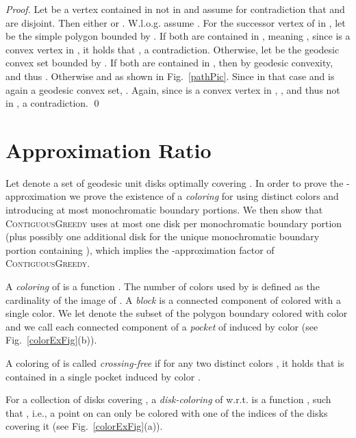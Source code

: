 \documentclass{llncs}
\begin{document}
\begin{proof}

Let  be a vertex contained in   not in  and assume for contradiction that  and  are disjoint. 
Then either  or . W.l.o.g.  assume  . For  the successor vertex of  in , let  be the simple polygon bounded by . If both  are contained in , meaning , since  is a convex vertex in , it holds that , a contradiction. Otherwise, let  be the geodesic convex set bounded by . If both  are contained in , then by geodesic convexity,  and thus . Otherwise  and  as shown in Fig.~\ref{pathPic}. Since in that case  and  is again a geodesic convex set, . Again, since  is a convex vertex in , , and thus  not in , a contradiction.
\qed


\end{proof}







\section{Approximation Ratio}
\label{approx}

Let  denote a set of geodesic unit disks optimally covering . In order to prove the -approximation we prove the existence of a {\em coloring} for   using  distinct colors and introducing at most  monochromatic boundary portions. We then show that  \textsc{ContiguousGreedy} uses at most one disk per monochromatic boundary portion (plus possibly one additional disk for the unique monochromatic boundary portion containing ), which implies the -approximation factor of  \textsc{ContiguousGreedy}. 

{A {\em coloring} of  is a function .  The number of colors used by  is defined as the cardinality of the image of }. A {\em block} is a connected component of  colored with a single color.  We let  denote the subset of the polygon boundary colored with color  and we call each connected component of  a \emph{pocket} of  induced by {color}  (see Fig.~\ref{colorExFig}(b)). 


A coloring of   is called {\em crossing-free} if for any two distinct colors {, it holds that } is contained in a single pocket induced by color .


For a collection  of disks covering , a \emph{disk-coloring} of  w.r.t.  is a function , such that , i.e., a point on   can only be colored with one of the indices of the disks covering it (see Fig.~\ref{colorExFig}(a)).
\end{document}
